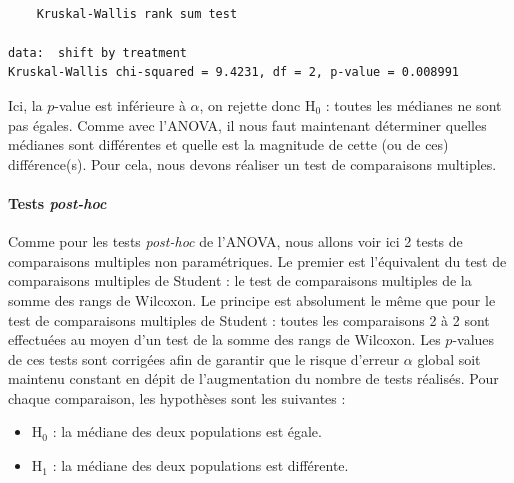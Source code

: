 \documentclass[a4paperpaper,]{article}
\newenvironment{Shaded}{\begin{snugshade}}{\end{snugshade}}
\newcommand{\CommentTok}[1]{\textcolor[rgb]{0.54,0.53,0.53}{#1}}
\newcommand{\KeywordTok}[1]{\textcolor[rgb]{0.12,0.11,0.11}{\textbf{#1}}}
\newcommand{\NormalTok}[1]{\textcolor[rgb]{0.12,0.11,0.11}{#1}}
\newcommand{\OperatorTok}[1]{\textcolor[rgb]{0.12,0.11,0.11}{#1}}
\newcommand{\StringTok}[1]{\textcolor[rgb]{0.75,0.01,0.01}{#1}}
\providecommand{\tightlist}{%
  \setlength{\itemsep}{0pt}\setlength{\parskip}{0pt}}
\let\oldparagraph\paragraph
\renewcommand{\paragraph}[1]{\oldparagraph{#1}\mbox{}}
\begin{document}
\begin{verbatim}

    Kruskal-Wallis rank sum test

data:  shift by treatment
Kruskal-Wallis chi-squared = 9.4231, df = 2, p-value = 0.008991
\end{verbatim}

Ici, la \(p\)-value est inférieure à \(\alpha\), on rejette donc H\(_0\) : toutes les médianes ne sont pas égales. Comme avec l'ANOVA, il nous faut maintenant déterminer quelles médianes sont différentes et quelle est la magnitude de cette (ou de ces) différence(s). Pour cela, nous devons réaliser un test de comparaisons multiples.

\hypertarget{tests-post-hoc-1}{%
\paragraph{\texorpdfstring{Tests \emph{post-hoc}}{Tests post-hoc}}\label{tests-post-hoc-1}}

Comme pour les tests \emph{post-hoc} de l'ANOVA, nous allons voir ici 2 tests de comparaisons multiples non paramétriques. Le premier est l'équivalent du test de comparaisons multiples de Student : le test de comparaisons multiples de la somme des rangs de Wilcoxon. Le principe est absolument le même que pour le test de comparaisons multiples de Student : toutes les comparaisons 2 à 2 sont effectuées au moyen d'un test de la somme des rangs de Wilcoxon. Les \(p\)-values de ces tests sont corrigées afin de garantir que le risque d'erreur \(\alpha\) global soit maintenu constant en dépit de l'augmentation du nombre de tests réalisés. Pour chaque comparaison, les hypothèses sont les suivantes :

\begin{itemize}
\tightlist
\item
  H\(_0\) : la médiane des deux populations est égale.
\item
  H\(_1\) : la médiane des deux populations est différente.
\end{itemize}

\begin{Shaded}
\end{Shaded}
\end{document}
